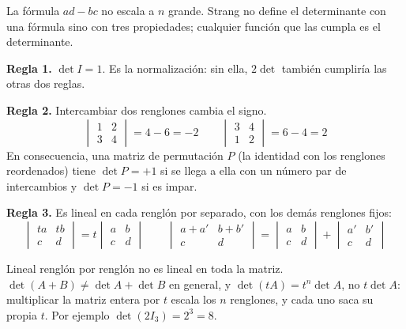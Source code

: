 \documentclass[11pt,letterpaper]{article}
\begin{document}
La fórmula $ad - bc$ no escala a $n$ grande. Strang no define el
determinante con una fórmula sino con tres propiedades; cualquier
función que las cumpla es el determinante.

\textbf{Regla 1.} $\det I = 1$. Es la normalización: sin ella, $2\det$
también cumpliría las otras dos reglas.

\textbf{Regla 2.} Intercambiar dos renglones cambia el signo.
\[
    \begin{vmatrix} 1 & 2 \\ 3 & 4 \end{vmatrix} = 4 - 6 = -2
    \qquad
    \begin{vmatrix} 3 & 4 \\ 1 & 2 \end{vmatrix} = 6 - 4 = 2
\]
En consecuencia, una matriz de permutación $P$ (la identidad con los
renglones reordenados) tiene $\det P = +1$ si se llega a ella con un
número par de intercambios y $\det P = -1$ si es impar.

\textbf{Regla 3.} Es lineal en cada renglón por separado, con los
demás renglones fijos:
\[
    \begin{vmatrix} ta & tb \\ c & d \end{vmatrix}
    = t \begin{vmatrix} a & b \\ c & d \end{vmatrix}
    \qquad
    \begin{vmatrix} a + a' & b + b' \\ c & d \end{vmatrix}
    = \begin{vmatrix} a & b \\ c & d \end{vmatrix}
    + \begin{vmatrix} a' & b' \\ c & d \end{vmatrix}
\]

\begin{ojo}
    Lineal renglón por renglón no es lineal en toda la matriz.
    $\det(A + B) \neq \det A + \det B$ en general, y
    $\det(tA) = t^{n} \det A$, no $t \det A$: multiplicar la matriz
    entera por $t$ escala los $n$ renglones, y cada uno saca su propia
    $t$. Por ejemplo $\det(2I_3) = 2^3 = 8$.
\end{ojo}

\end{document}
